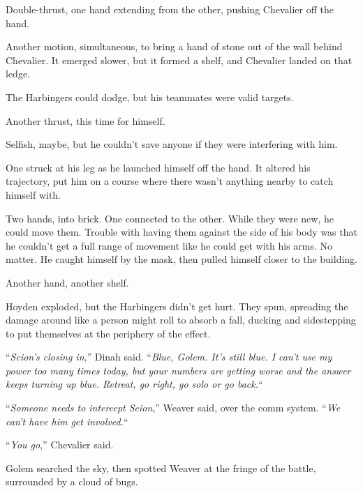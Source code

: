Double-thrust, one hand extending from the other, pushing Chevalier off the hand.



Another motion, simultaneous, to bring a hand of stone out of the wall behind Chevalier.  It emerged slower, but it formed a shelf, and Chevalier landed on that ledge.



The Harbingers could dodge, but his teammates were valid targets.



Another thrust, this time for himself.



Selfish, maybe, but he couldn't save anyone if they were interfering with him.



One struck at his leg as he launched himself off the hand.  It altered his trajectory, put him on a course where there wasn't anything nearby to catch himself with.



Two hands, into brick.  One connected to the other.  While they were new, he could move them.  Trouble with having them against the side of his body was that he couldn't get a full range of movement like he could get with his arms.  No matter.  He caught himself by the mask, then pulled himself closer to the building.



Another hand, another shelf.



Hoyden exploded, but the Harbingers didn't get hurt.  They spun, spreading the damage around like a person might roll to absorb a fall, ducking and sidestepping to put themselves at the periphery of the effect.



``\emph{Scion's closing in},'' Dinah said.  ``\emph{Blue, Golem.  It's still blue.  I can't use my power too many times today, but your numbers are getting worse and the answer keeps turning up blue.  Retreat, go right, go solo or go back.}``



``\emph{Someone needs to intercept Scion},'' Weaver said, over the comm system. ``\emph{We can't have him get involved.}``



``\emph{You go},'' Chevalier said.



Golem searched the sky, then spotted Weaver at the fringe of the battle, surrounded by a cloud of bugs.



